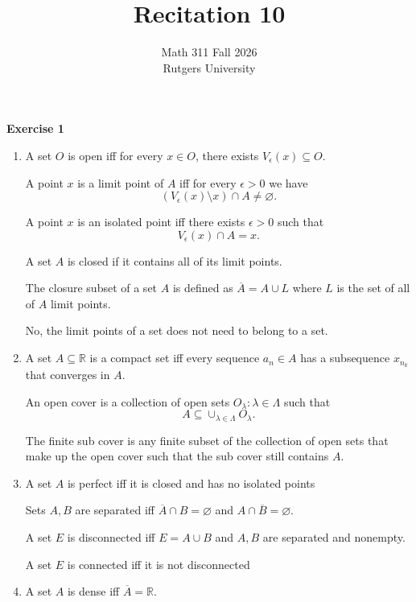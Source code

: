 \documentclass[12pt]{article}
\title{Recitation 10}
\author{Math 311 Fall 2026 \\ Rutgers University}
\date{}
\begin{document}
\maketitle

\textbf{Exercise 1}
\begin{enumerate}[label=(\alph*)]
    \item A set \( O \) is open iff for every \( x \in O \), there exists \( V_{\epsilon}(x) \subseteq O \).

          A point \( x \) is a limit point of \( A \) iff for every \( \epsilon > 0 \) we have
          \[
              (V_{\epsilon}(x) \setminus {x}) \cap A \neq \varnothing .
          \]

          A point \( x \) is an isolated point iff there exists \(\epsilon > 0\) such that
          \[
              V_{\epsilon}(x) \cap A = {x}.
          \]

          A set \( A\) is closed if it contains all of its limit points.

          The closure subset of a set \( A \) is defined as \( \overline{A} = A \cup L \) where \( L \) is the set of all of \(A\) limit points.

          No, the limit points of a set does not need to belong to a set.

    \item A set \( A \subseteq \mathbb{R} \) is a compact set iff every sequence \( a_n \in A \) has a subsequence \(x_{n_k}\) that converges in \(A\).

          An open cover is a collection of open sets \( O_\lambda : \lambda \in \Lambda \) such that
          \[
              A \subseteq \cup_{\lambda \in \Lambda} O_\lambda.
          \]

          The finite sub cover is any finite subset of the collection of open sets that make up the open cover such that the sub cover still contains \( A \).

    \item A set \( A \) is perfect iff it is closed and has no isolated points

          Sets \(A, B \) are separated iff \( \overline{A} \cap B = \varnothing \) and \(A \cap \overline{B} = \varnothing \).

          A set \( E \) is disconnected iff \(E = A \cup B\) and \(A,B\) are separated and nonempty.

          A set \( E \) is connected iff it is not disconnected

    \item A set \( A \) is dense iff \( \overline{A} = \mathbb{R} \).


\end{enumerate}
\end{document}
